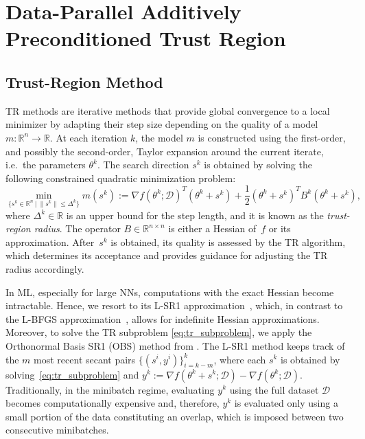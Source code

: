 \documentclass{article}
\begin{document}
\section{Data-Parallel Additively Preconditioned Trust Region}
\subsection{Trust-Region Method}
\label{subsec:tr_method}
TR methods \cite{connGouldToint2000} are iterative methods that provide global convergence to a local minimizer by adapting their step size depending on the quality of a model $m \colon \mathbb{R}^n \longrightarrow \mathbb{R}$. 
At each iteration $k$, the model $m$ is constructed using the first-order, and possibly the second-order, Taylor expansion around the current iterate, i.e.~the parameters $\theta^k$. 
The search direction $s^k$ is obtained by solving the following constrained quadratic minimization problem:
\begin{equation}
\label{eq:tr_subproblem}
\min_{\{s^k \in \mathbb{R}^n~|~\| s^k \| \leq \Delta^k\}} m(s^k) :=
\nabla f(\theta^k; \mathcal{D})^T (\theta^k+s^k) + \frac{1}{2} (\theta^k + s^k)^T B^k (\theta^k+s^k),
\end{equation}
where $\Delta^k \in \mathbb{R}$ is an upper bound for the step length, and it is known as the \textit{trust-region radius}. 
The operator $B \in \mathbb{R}^{n \times n}$ is either a Hessian of~$f$ or its approximation. After~$s^k$ is obtained, its quality is assessed by the TR algorithm, which determines its acceptance and provides guidance for adjusting the TR radius accordingly.

In ML, especially for large NNs, computations with the exact Hessian become intractable. 
Hence, we resort to its L-SR1 approximation~\cite{ erwayMarcia2015}, which, in contrast to the L-BFGS approximation~\cite{nocedalWright1999}, allows for indefinite Hessian approximations.
Moreover, to solve the TR subproblem \eqref{eq:tr_subproblem}, we apply the Orthonormal Basis SR1 (OBS) method from \cite{brust2017, erway2020}. 
The L-SR1 method keeps track of the $m$ most recent secant pairs $\{ (s^i, y^i) \}_{i=k-m}^k$, where each $s^k$ is obtained by solving~\eqref{eq:tr_subproblem} and 
$y^k := \nabla f(\theta^{k} +s^k ; \mathcal{D}) - \nabla f(\theta^k; \mathcal{D})$. 
Traditionally, in the minibatch regime, evaluating $y^k$ using the full dataset $\mathcal{D}$ becomes computationally expensive and, therefore, $y^k$ is evaluated only using a small portion of the data constituting an overlap, which is imposed between two consecutive minibatches.
\end{document}
